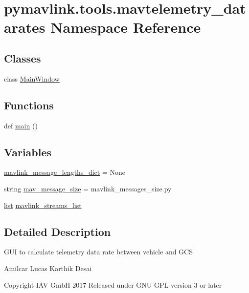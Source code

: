 \hypertarget{namespacepymavlink_1_1tools_1_1mavtelemetry__datarates}{}\section{pymavlink.\+tools.\+mavtelemetry\+\_\+datarates Namespace Reference}
\label{namespacepymavlink_1_1tools_1_1mavtelemetry__datarates}
\subsection*{Classes}
\begin{DoxyCompactItemize}
\item 
class \mbox{\hyperlink{classpymavlink_1_1tools_1_1mavtelemetry__datarates_1_1MainWindow}{Main\+Window}}
\end{DoxyCompactItemize}
\subsection*{Functions}
\begin{DoxyCompactItemize}
\item 
def \mbox{\hyperlink{namespacepymavlink_1_1tools_1_1mavtelemetry__datarates_a486c675378d0dd5d99ce8ee54d4245a4}{main}} ()
\end{DoxyCompactItemize}
\subsection*{Variables}
\begin{DoxyCompactItemize}
\item 
\mbox{\hyperlink{namespacepymavlink_1_1tools_1_1mavtelemetry__datarates_a5a8c15934df507a2bb6a7adc1df0aea4}{mavlink\+\_\+message\+\_\+lengths\+\_\+dict}} = None
\item 
string \mbox{\hyperlink{namespacepymavlink_1_1tools_1_1mavtelemetry__datarates_a04bdfe2a58fc2f78bbf4126c961662f1}{mav\+\_\+message\+\_\+size}} = \textquotesingle{}mavlink\+\_\+messages\+\_\+size.\+py\textquotesingle{}
\item 
\mbox{\hyperlink{structlist}{list}} \mbox{\hyperlink{namespacepymavlink_1_1tools_1_1mavtelemetry__datarates_a62bdc6d64839990912e370e2b7c2305c}{mavlink\+\_\+streams\+\_\+list}}
\end{DoxyCompactItemize}


\subsection{Detailed Description}
\begin{DoxyVerb}GUI to calculate telemetry data rate between vehicle and GCS

Amilcar Lucas
Karthik Desai

Copyright IAV GmbH 2017
Released under GNU GPL version 3 or later
\end{DoxyVerb}
 

